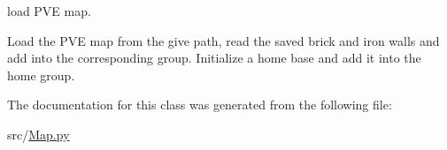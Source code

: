 load P\+VE map. 

Load the P\+VE map from the give path, read the saved brick and iron walls and add into the corresponding group. Initialize a home base and add it into the home group. 

The documentation for this class was generated from the following file\+:\begin{DoxyCompactItemize}
\item 
src/\mbox{\hyperlink{_map_8py}{Map.\+py}}\end{DoxyCompactItemize}

